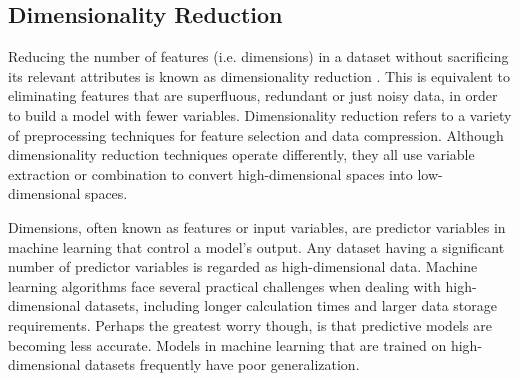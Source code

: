 \subsection{Dimensionality Reduction}
Reducing the number of features (i.e. dimensions) in a dataset without sacrificing its relevant attributes is known as dimensionality reduction \cite{deng2022dimensionality}. This is equivalent to eliminating features that are superfluous, redundant or just noisy data, in order to build a model with fewer variables. Dimensionality reduction refers to a variety of preprocessing techniques for feature selection and data compression. Although dimensionality reduction techniques operate differently, they all use variable extraction or combination to convert high-dimensional spaces into low-dimensional spaces.\cite{deng2022dimensionality}

\vspace{5mm}

Dimensions, often known as features or input variables, are predictor variables in machine learning that control a model's output.  Any dataset having a significant number of predictor variables is regarded as high-dimensional data. Machine learning algorithms face several practical challenges when dealing with high-dimensional datasets, including longer calculation times and larger data storage requirements. Perhaps the greatest worry though, is that predictive models are becoming less accurate. Models in machine learning that are trained on high-dimensional datasets frequently have poor generalization.\cite{deng2022dimensionality}

\vspace{5mm}

